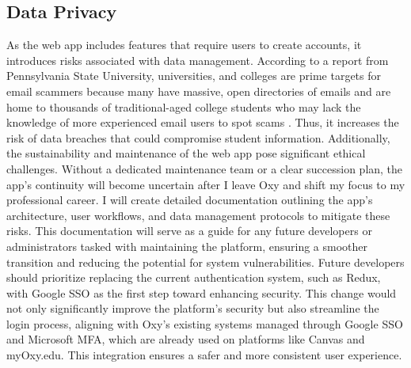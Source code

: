 \documentclass[10pt,twocolumn]{article}
\begin{document}
\subsection{Data Privacy}
As the web app includes features that require users to create accounts, it introduces risks associated with data management. According to a report from Pennsylvania State University, universities, and colleges are prime targets for email scammers because many have massive, open directories of emails and are home to thousands of traditional-aged college students who may lack the knowledge of more experienced email users to spot scams \cite{Ford2023}. Thus, it increases the risk of data breaches that could compromise student information. Additionally, the sustainability and maintenance of the web app pose significant ethical challenges. Without a dedicated maintenance team or a clear succession plan, the app's continuity will become uncertain after I leave Oxy and shift my focus to my professional career. I will create detailed documentation outlining the app's architecture, user workflows, and data management protocols to mitigate these risks. This documentation will serve as a guide for any future developers or administrators tasked with maintaining the platform, ensuring a smoother transition and reducing the potential for system vulnerabilities. Future developers should prioritize replacing the current authentication system, such as Redux, with Google SSO as the first step toward enhancing security. This change would not only significantly improve the platform’s security but also streamline the login process, aligning with Oxy's existing systems managed through Google SSO and Microsoft MFA, which are already used on platforms like Canvas and myOxy.edu. This integration ensures a safer and more consistent user experience.
\end{document}

